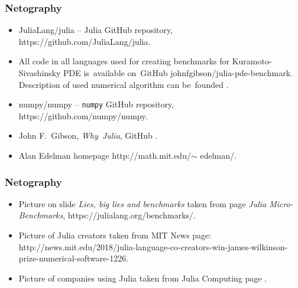 \documentclass[10pt,t]{beamer}
\begin{document}
\begin{frame}
  \frametitle{Netography}


  \begin{itemize}

  \item JuliaLang/julia -- Julia GitHub repository,
    {https://github.com/JuliaLang/julia}.

  \item All code in all languages used for creating benchmarks for
    Kuramoto-Sivashinsky PDE is~available on~GitHub
    {johnfgibson/julia-pde-benchmark}.
    Description of used numerical algorithm can be~founded
    .

    \item numpy/numpy -- \texttt{numpy} GitHub repository,
      {https://github.com/numpy/numpy}.

  \item John F.~Gibson, \textit{Why~Julia}, GitHub
    .

  \item Alan Edelman homepage
    {http://math.mit.edu/$\sim$ edelman/}.

  \end{itemize}

\end{frame}





\begin{frame}
  \frametitle{Netography}


  \begin{itemize}

  \item Picture on slide \textit{Lies, big lies and benchmarks} taken from
    page \textit{Julia Micro-Benchmarks},
    {https://julialang.org/benchmarks/}.

  \item Picture of Julia creators taken from MIT News page: 
    {http://news.mit.edu/2018/julia-language-co-creators-win-james-wilkinson-prize-numerical-software-1226}.

  \item Picture of companies using Julia taken from Julia Computing page .

  \end{itemize}

\end{frame}
\end{document}
